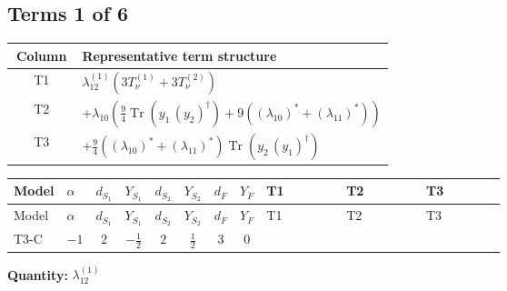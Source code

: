 \documentclass[8pt]{article}
\begin{document}
\begin{landscape}
\subsection*{Terms 1 of 6}
\begin{center}
\begin{tabular}{@{}c >{\raggedright\arraybackslash}p{0.82\linewidth}@{}}
\toprule
Column & Representative term structure \\
\midrule
T1 & \(\displaystyle {\lambda_{12}^{(1)}} (3 T_{\nu}^{(1)}+3 T_{\nu}^{(2)})\) \\
\midrule
T2 & \(\displaystyle +{\lambda_{10}} \left(\frac{9}{4} \operatorname{Tr}\!\left({y_1}\,\left({y_2}\right)^{\dagger}\right)+9 (\left({\lambda_{10}}\right)^{*}+\left({\lambda_{11}}\right)^{*})\right)\) \\
\midrule
T3 & \(\displaystyle +\frac{9}{4} (\left({\lambda_{10}}\right)^{*}+\left({\lambda_{11}}\right)^{*}) \operatorname{Tr}\!\left({y_2}\,\left({y_1}\right)^{\dagger}\right)\) \\
\midrule
\bottomrule
\end{tabular}
\end{center}
\smallskip
\tiny
\begin{longtable}{@{}llcccccc >{\raggedright\arraybackslash}p{0.21\linewidth} >{\raggedright\arraybackslash}p{0.21\linewidth} >{\raggedright\arraybackslash}p{0.21\linewidth}@{}}
\toprule
Model & $\alpha$ & $d_{S_1}$ & $Y_{S_1}$ & $d_{S_2}$ & $Y_{S_2}$ & $d_F$ & $Y_F$ & T1 & T2 & T3 \\
\midrule
\endfirsthead
\toprule
Model & $\alpha$ & $d_{S_1}$ & $Y_{S_1}$ & $d_{S_2}$ & $Y_{S_2}$ & $d_F$ & $Y_F$ & T1 & T2 & T3 \\
\midrule
\endhead
T3-C & $-1$ & $2$ & $-\frac{1}{2}$ & $2$ & $\frac{1}{2}$ & $3$ & $0$ & \scriptsize\adjustbox{max width=\linewidth}{$\begin{gathered} {\lambda_{12}^{(1)}} (3 T_{\nu}^{(1)}+3 T_{\nu}^{(2)})\end{gathered}$} & \scriptsize\adjustbox{max width=\linewidth}{$\begin{gathered} +{\lambda_{10}} \left(\frac{9}{4} \operatorname{Tr}\!\left({y_1}\,\left({y_2}\right)^{\dagger}\right)+9 (\left({\lambda_{10}}\right)^{*}+\left({\lambda_{11}}\right)^{*})\right) \\ +{\lambda_{11}} \left(\frac{9}{4} \operatorname{Tr}\!\left({y_1}\,\left({y_2}\right)^{\dagger}\right)+9 (\left({\lambda_{10}}\right)^{*}+\left({\lambda_{11}}\right)^{*})\right)\end{gathered}$} & \scriptsize\adjustbox{max width=\linewidth}{$\begin{gathered} +\frac{9}{4} (\left({\lambda_{10}}\right)^{*}+\left({\lambda_{11}}\right)^{*}) \operatorname{Tr}\!\left({y_2}\,\left({y_1}\right)^{\dagger}\right)\end{gathered}$} \\
\midrule
\bottomrule
\end{longtable}
\clearpage
\noindent\textbf{Quantity: }$\lambda_{12}^{(1)}$\par\smallskip

\end{landscape}
\end{document}
